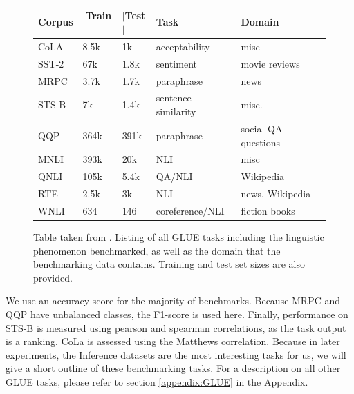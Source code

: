 \documentclass[a4paper,12pt,twoside,openright]{report}
\begin{document}
\begin{figure}[h]
\center
\begin{tabular}{
 l %
 l %
 l
 l
 l
 l
}
\toprule
\textbf{Corpus} & \textbf{ $|$Train$|$ } &\textbf{$|$Test$|$} & \textbf{Task} & \textbf{Domain}  \\
\midrule
CoLA  & 8.5k  &  1k   & acceptability &  misc \\

SST-2 & 67k &  1.8k  & sentiment &  movie reviews \\

MRPC & 3.7k &  1.7k & paraphrase & news \\
          
STS-B & 7k &  1.4k    & sentence similarity &  misc. \\
      
QQP & 364k &  391k & paraphrase  &  social QA questions\\	

MNLI & 393k &  20k  & NLI  &  misc \\

QNLI & 105k &  5.4k & QA/NLI &  Wikipedia \\

RTE & 2.5k &  3k      & NLI &  news, Wikipedia \\

WNLI & 634 &  146   & coreference/NLI & fiction books \\

      
\bottomrule
\end{tabular}
\caption{Table taken from \cite{wang19}. Listing of all GLUE tasks including the linguistic phenomenon benchmarked, as well as the domain that the benchmarking data contains. Training and test set sizes are also provided.}
\end{figure}

We use an accuracy score for the majority of benchmarks. 
Because MRPC and QQP have unbalanced classes, the F1-score is used here. 
Finally, performance on STS-B is measured using pearson and spearman correlations, as the task output is a ranking.
CoLa is assessed using the Matthews correlation.
Because in later experiments, the Inference datasets are the most interesting tasks for us, we will give a short outline of these benchmarking tasks. 
For a description on all other GLUE tasks, please refer to section \ref{appendix:GLUE} in the Appendix.
\end{document}
